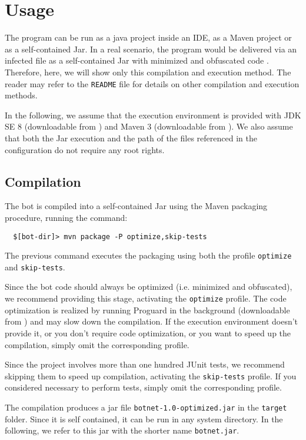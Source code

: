 \section{Usage}
\label{sec:usage}

The program can be run as a java project inside an IDE, as a Maven project or as a self-contained Jar.
In a real scenario, the program would be delivered via an infected file as a self-contained Jar with minimized and obfuscated code \cite{anderson2008security}. Therefore, here, we will show only this compilation and execution method.
The reader may refer to the \texttt{README} file for details on other compilation and execution methods.

In the following, we assume that the execution environment is provided with JDK SE 8 (downloadable from \cite{jdk}) and Maven 3 (downloadable from \cite{maven}). We also assume that both the Jar execution and the path of the files referenced in the configuration do not require any root rights.

\subsection{Compilation}
\label{sec:compilation}

The bot is compiled into a self-contained Jar using the Maven packaging procedure, running the command:

\begin{verbatim}
  $[bot-dir]> mvn package -P optimize,skip-tests
\end{verbatim}

The previous command executes the packaging using both the profile \texttt{optimize} and \texttt{skip-tests}.

Since the bot code should always be optimized (i.e. minimized and obfuscated), we recommend providing this stage, activating the \texttt{optimize} profile. The code optimization is realized by running Proguard in the background (downloadable from \cite{proguard}) and may slow down the compilation. If the execution environment doesn't provide it, or you don't require code optimization, or you want to speed up the compilation, simply omit the corresponding profile.

Since the project involves more than one hundred JUnit tests, we recommend skipping them to speed up compilation, activating the \texttt{skip-tests} profile. If you considered necessary to perform tests, simply omit the corresponding profile.

The compilation produces a jar file \texttt{botnet-1.0-optimized.jar} in the \texttt{target} folder. Since it is self contained, it can be run in any system directory. In the following, we refer to this jar with the shorter name \texttt{botnet.jar}.


